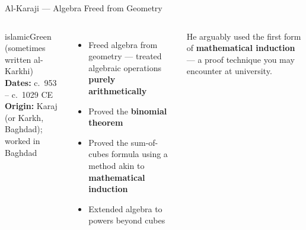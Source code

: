 \begin{frame}[shrink=3]{Al-Karaji --- Algebra Freed from Geometry}
  \begin{columns}[T]
    \begin{personbox}{islamicGreen}
      {\small (sometimes written al-Karkhi)}\\[3pt]
      \textbf{Dates:} c.\ 953 -- c.\ 1029 CE\\
      \textbf{Origin:} Karaj (or Karkh, Baghdad); worked in Baghdad
    \end{personbox}
    \vspace{0.3em}
    \begin{itemize}
      \item Freed algebra from geometry --- treated algebraic operations \textbf{purely arithmetically}
      \item Proved the \textbf{binomial theorem}
      \item Proved the sum-of-cubes formula using a method akin to \textbf{mathematical induction}
      \item Extended algebra to powers beyond cubes
    \end{itemize}


    \vspace{0.6em}
    \begin{insightbox}
      {\footnotesize He arguably used the first form of \textbf{mathematical induction} --- a proof technique you may encounter at university.}
    \end{insightbox}
  \end{columns}

\end{frame}

